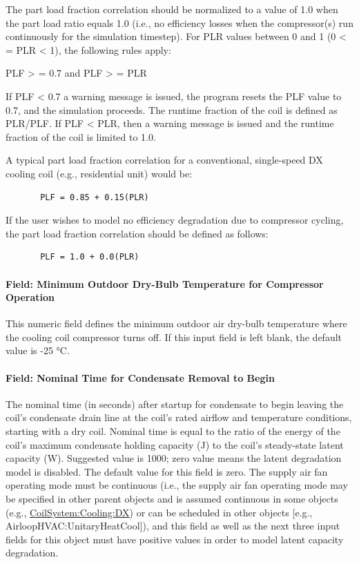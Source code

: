 The part load fraction correlation should be normalized to a value of 1.0 when the part load ratio equals 1.0 (i.e., no efficiency losses when the compressor(s) run continuously for the simulation timestep). For PLR values between 0 and 1 (0 \textless{} = PLR \textless{} 1), the following rules apply:

PLF \textgreater{} = 0.7 and PLF \textgreater{} = PLR

If PLF \textless{} 0.7 a warning message is issued, the program resets the PLF value to 0.7, and the simulation proceeds. The runtime fraction of the coil is defined as PLR/PLF. If PLF \textless{} PLR, then a warning message is issued and the runtime fraction of the coil is limited to 1.0.

A typical part load fraction correlation for a conventional, single-speed DX cooling coil (e.g., residential unit) would be:

\begin{lstlisting}
       PLF = 0.85 + 0.15(PLR)
\end{lstlisting}

If the user wishes to model no efficiency degradation due to compressor cycling, the part load fraction correlation should be defined as follows:

\begin{lstlisting}
       PLF = 1.0 + 0.0(PLR)
\end{lstlisting}

\paragraph{Field: Minimum Outdoor Dry-Bulb Temperature for Compressor Operation}

This numeric field defines the minimum outdoor air dry-bulb temperature where the cooling coil compressor turns off. If this input field is left blank, the default value is -25 °C.

\paragraph{Field: Nominal Time for Condensate Removal to Begin}\label{field-nominal-time-for-condensate-removal-to-begin}

The nominal time (in seconds) after startup for condensate to begin leaving the coil's condensate drain line at the coil's rated airflow and temperature conditions, starting with a dry coil. Nominal time is equal to the ratio of the energy of the coil's maximum condensate holding capacity (J) to the coil's steady-state latent capacity (W). Suggested value is 1000; zero value means the latent degradation model is disabled. The default value for this field is zero. The supply air fan operating mode must be continuous (i.e., the supply air fan operating mode may be specified in other parent objects and is assumed continuous in some objects (e.g., \hyperref[coilsystemcoolingdx]{CoilSystem:Cooling:DX}) or can be scheduled in other objects {[}e.g., AirloopHVAC:UnitaryHeatCool{]}), and this field as well as the next three input fields for this object must have positive values in order to model latent capacity degradation.

